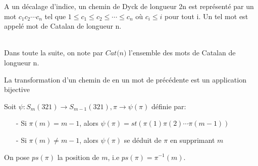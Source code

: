 
\begin{definition}
	\begin{rm}
		A un décalage d'indice, un chemin de Dyck de longueur 2n est représenté par un mot $c_{1}c_{2}
			\cdots c_{n}$ tel que $1 \leq c_{1} \leq c_{2} \leq \cdots \leq c_{n}$ où $c_{i} \leq i$ pour
		tout i. Un tel mot est appelé mot de Catalan de longueur n.
	\end{rm}
\end{definition}
\newpage
\text{}\\
Dans toute la suite, on note par $\textit{Cat(n)}$ l'ensemble des mots de Catalan  de longueur n.
\begin{lemme}
	La transformation d'un chemin de  en un mot de  précédente est un application bijective
\end{lemme}


\begin{definition} \label{psiDef_}
	\begin{rm}
		Soit $\psi: S_{m}(321)\longrightarrow S_{m-1}(321), \pi \longrightarrow \psi(\pi)$ définie par:
		\begin{itemize}
			\item [-] Si $\pi(m)=m-1$, alors $\psi(\pi)=st(\pi(1)\pi(2)\cdots \pi(m-1))$
			\item [-] Si $\pi(m)\neq m-1$, alors $\psi(\pi)$ se déduit de $\pi$ en supprimant $m$
		\end{itemize}
		On pose $ps(\pi)$ la position de $m$, i.e $ps(\pi)=\pi^{-1}(m)$.
	\end{rm}
\end{definition}

